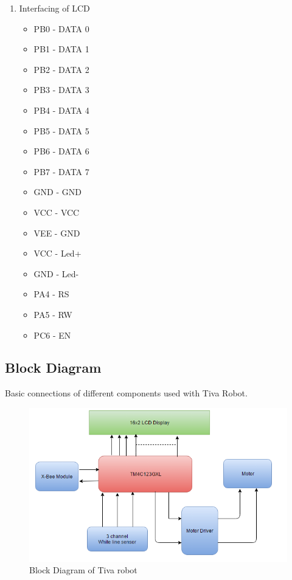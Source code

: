 \documentclass[a4paper,12pt,oneside]{book}
\begin{document}
\begin {enumerate}
\begin{itemize}
\item GND  - GND
\end{itemize}
\item Interfacing of LCD
\begin{itemize}
\item PB0  - DATA 0
\item PB1  - DATA 1
\item PB2  - DATA 2
\item PB3  - DATA 3
\item PB4  - DATA 4
\item PB5  - DATA 5
\item PB6  - DATA 6
\item PB7  - DATA 7
\item GND  - GND
\item VCC  - VCC
\item VEE  - GND
\item VCC  - Led+
\item GND  - Led-
\item PA4  - RS
\item PA5  - RW
\item PC6  - EN
\end{itemize}
\end{enumerate}
\newpage
\subsection*{Block Diagram}
Basic connections of different components used with Tiva Robot.
\\
\begin{figure}[h]
        \centering
        \includegraphics[scale=0.9]{Block}
        \caption{Block Diagram of Tiva robot}
      \end{figure}
      \newpage
\end{document}

